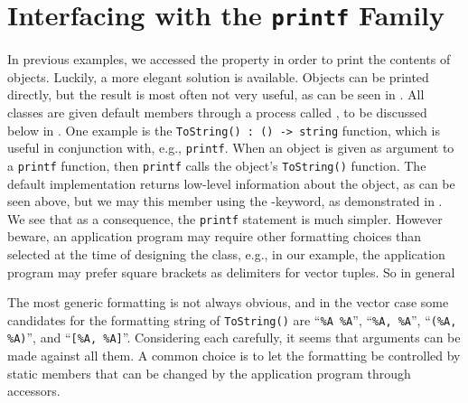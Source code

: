 \section{Interfacing with the \lstinline{printf} Family}
In previous examples, we accessed the property in order to print the contents of objects. Luckily, a more elegant solution is available. Objects can be printed directly, but the result is most often not very useful, as can be seen in .
%
%
All classes are given default members through a process called , to be discussed below in . One example is the \lstinline{ToString() : () -> string} function, which is useful in conjunction with, e.g., \lstinline{printf}. When an object is given as argument to a \lstinline{printf} function, then \lstinline{printf} calls the object's \lstinline{ToString()} function. The default implementation returns low-level information about the object, as can be seen above, but we may 
 this member using the -keyword, as demonstrated in .
%
%
We see that as a consequence, the \lstinline{printf} statement is much simpler. However beware, an application program may require other formatting choices than selected at the time of designing the class, e.g., in our example, the application program may prefer square brackets as delimiters for vector tuples.  So in general  

The most generic formatting is not always obvious, and in the vector case some candidates for the formatting string of \lstinline{ToString()} are ``\lstinline{%A %A}'', ``\lstinline{%A, %A}'', ``\lstinline{(%A, %A)}'', and ``\lstinline{[%A, %A]}''.
 Considering each carefully, it seems that arguments can be made against all them. A common choice is to let the formatting be controlled by static members that can be changed by the application program through accessors.

